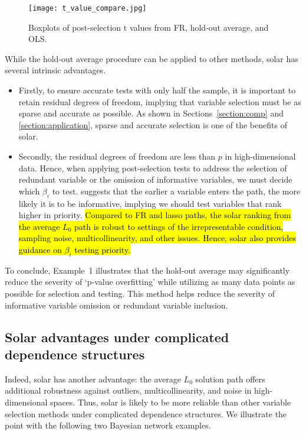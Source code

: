 \documentclass[11pt,review,authoryear]{elsarticle}
\begin{document}
\begin{figure}[h]
%
  \centering
%
  \texttt{[image: t\_value\_compare.jpg]}
%
  \caption{Boxplots of post-selection t values from FR, hold-out average, and OLS.}
%
  \label{fig:t_value_compare}
%
\end{figure}

While the hold-out average procedure can be applied to other methods, solar has several intrinsic advantages.

\begin{itemize}
  \item Firstly, to ensure accurate tests with only half the sample, it is important to retain residual degrees of freedom, implying that variable selection must be as sparse and accurate as possible. As shown in Sections~\ref{section:comp} and \ref{section:application}, sparse and accurate selection is one of the benefits of solar.
  \item Secondly, the residual degrees of freedom are less than $p$ in high-dimensional data. Hence, when applying post-selection tests to address the selection of redundant variable or the omission of informative variables, we must decide which $\beta_i$ to test. \citet[Theorem~2]{zhang09} suggests that the earlier a variable enters the path, the more likely it is to be informative, implying we should test variables that rank higher in priority. \hl{Compared to FR and lasso paths, the solar ranking from the average $L_0$ path is robust to settings of the irrepresentable condition, sampling noise, multicollinearity, and other issues. Hence, solar also provides guidance on $\beta_i$ testing priority.}
\end{itemize}

To conclude, Example~1 illustrates that the hold-out average may significantly reduce the severity of `p-value overfitting' while utilizing as many data points as possible for selection and testing. This method helps reduce the severity of informative variable omission or redundant variable inclusion.

\subsection{Solar advantages under complicated dependence structures\label{section:example}}

Indeed, solar has another advantage: the average $L_0$ solution path offers additional robustness against outliers, multicollinearity, and noise in high-dimensional spaces. Thus, solar is likely to be more reliable than other variable selection methods under complicated dependence structures. We illustrate the point with the following two Bayesian network examples.
\end{document}
